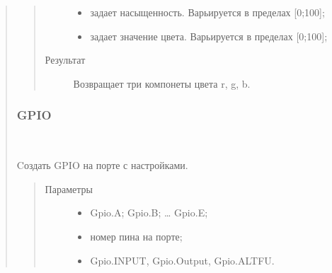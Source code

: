 \documentclass[a4paper,10pt,russian]{sphinxmanual}
\begin{document}
\begin{quote}
\begin{fulllineitems}
\begin{quote}
\begin{description}
\begin{itemize}
\item {} 
 \textendash{} задает насыщенность. Варьируется в пределах {[}0;100{]};

\item {} 
 \textendash{} задает значение цвета. Варьируется в пределах {[}0;100{]};

\end{itemize}

\item[{Результат}] \leavevmode
Возвращает три компонеты цвета r, g, b.

\end{description}\end{quote}

\end{fulllineitems}



\subsubsection{GPIO}
\label{\detokenize{programming/lua/lua:gpio}}

\begin{fulllineitems}
\label{\detokenize{programming/lua/lua:Gpio}}~

\begin{fulllineitems}
\label{\detokenize{programming/lua/lua:Gpio.new}}
Cоздать GPIO на порте с настройками.
\begin{quote}\begin{description}
\item[{Параметры}] \leavevmode\begin{itemize}
\item {} 
 \textendash{} Gpio.A; Gpio.B; … Gpio.E;

\item {} 
 \textendash{} номер пина на порте;

\item {} 
 \textendash{} Gpio.INPUT, Gpio.Output, Gpio.ALTFU.

\end{itemize}


\end{description}
\end{quote}
\end{fulllineitems}
\end{fulllineitems}
\end{quote}
\end{document}
